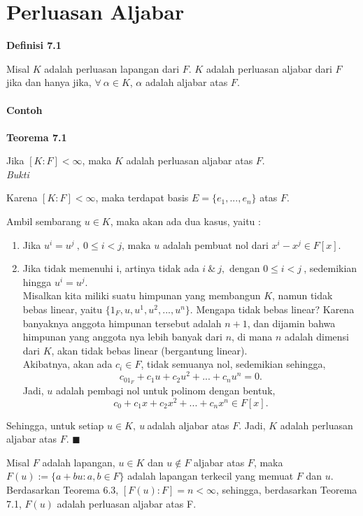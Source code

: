 

\chapter{Perluasan Aljabar}
	\textbf{Definisi 7.1} 	
\par 	Misal $K$ adalah perluasan lapangan dari $F$. $K$ adalah perluasan aljabar dari $F$ jika dan hanya jika, $\forall~\alpha \in K$, $\alpha$ adalah aljabar atas $F$.
\\
\\
\textbf{Contoh}%
\\
\\
\textbf{Teorema 7.1}
\par 	Jika $[K:F] < \infty$, maka $K$ adalah perluasan aljabar atas $F$.
\\
\textit{Bukti}
\par 	Karena $[K:F] < \infty$, maka terdapat basis $E= \{ e_1,...,e_n\}$ atas $F$.
\par 	Ambil sembarang $u \in K$, maka akan ada dua kasus, yaitu :
	\begin{enumerate}	
	\renewcommand{\labelenumi}
	{\roman{enumi}}
	\item Jika $u^i=u^j~,~0 \le i<j$, maka $u$ adalah pembuat nol dari $x^i-x^j\in F[x].$
	\item Jika tidak memenuhi i, artinya tidak ada $i~\& ~j,$ dengan $0 \le i<j~$, sedemikian hingga $u^i=u^j$.
\\	Misalkan kita miliki suatu himpunan yang membangun $K$, namun tidak bebas linear, yaitu $\{1_F, u,u^1,u^2,...,u^n\}$. Mengapa tidak bebas linear? Karena banyaknya anggota himpunan tersebut adalah $n+1$, dan dijamin bahwa himpunan yang anggota nya lebih banyak 		dari $n$, di mana $n$ adalah dimensi dari $K$, akan tidak bebas linear (bergantung linear).	
\\	Akibatnya, akan ada $c_i\in F$, tidak semuanya nol, sedemikian sehingga, $$c_01_F + c_1u + c_2u^2+...+c_nu^n = 0.$$
	Jadi, $u$ adalah pembagi nol untuk polinom dengan bentuk, $$c_0+ c_1x + c_2x^2+...+c_nx^n \in F[x].$$	
	\end{enumerate}
\par 	Sehingga, untuk setiap $u\in K,~u~$adalah aljabar atas $F$. Jadi, $K$ adalah perluasan aljabar atas $F$. $\blacksquare$
\par 	Misal $F$ adalah lapangan, $u\in K$ dan $u \notin F$ aljabar atas $F$, maka $F(u):=\{a+bu: a,b\in F\}$ adalah lapangan terkecil yang memuat $F$ dan $u$. Berdasarkan Teorema 6.3, $[F(u):F] = n <\infty$, sehingga, berdasarkan Teorema 7.1, $F(u)$ adalah perluasan aljabar 			atas F.
